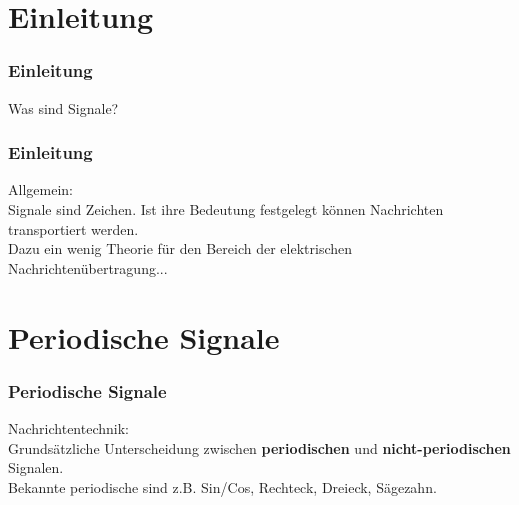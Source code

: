 

\subtitle{Technik Klasse A 11: \\
          Signale \\[2em]}
\date{Stand 11.06.2015}


\section{Einleitung}

\begin{frame}
    \frametitle{Einleitung}

    Was sind Signale?

\end{frame}

\begin{frame}
    \frametitle{Einleitung}

    Allgemein: \\[2em]

    Signale sind Zeichen. Ist ihre Bedeutung festgelegt können Nachrichten
    transportiert werden. \\[2em]

    Dazu ein wenig Theorie für den Bereich der elektrischen Nachrichtenübertragung...

\end{frame}

\section{Periodische Signale}

\begin{frame}
    \frametitle{Periodische Signale}

    Nachrichtentechnik: \\[2em]
    
    Grundsätzliche Unterscheidung zwischen
    \textbf{periodischen} und \textbf{nicht-periodischen} Signalen. \\[2em]

    Bekannte periodische sind z.B. Sin/Cos, Rechteck, Dreieck, Sägezahn.

\end{frame}

